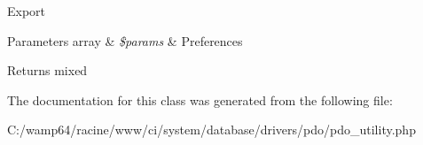 Export


\begin{DoxyParams}[1]{Parameters}
array & {\em \$params} & Preferences \\
\hline
\end{DoxyParams}
\begin{DoxyReturn}{Returns}
mixed 
\end{DoxyReturn}


The documentation for this class was generated from the following file\+:\begin{DoxyCompactItemize}
\item 
C\+:/wamp64/racine/www/ci/system/database/drivers/pdo/pdo\+\_\+utility.\+php\end{DoxyCompactItemize}
